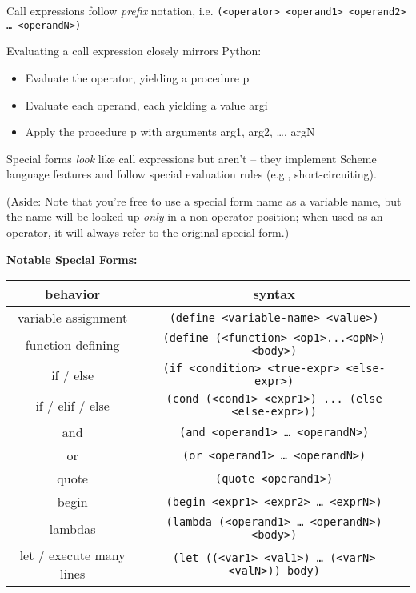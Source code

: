 Call expressions follow \textit{prefix} notation, i.e.
\texttt{(<operator> <operand1> <operand2> … <operandN>)}

Evaluating a call expression closely mirrors Python:
\begin{itemize}
\item Evaluate the operator, yielding a procedure p
\item Evaluate each operand, each yielding a value argi
\item Apply the procedure p with arguments arg1, arg2, …, argN
\end{itemize}

Special forms \textit{look} like call expressions but aren’t -- they implement Scheme language features and follow special evaluation rules (e.g., short-circuiting).

(Aside: Note that you’re free to use a special form name as a variable name, but the name will be looked up \textit{only} in a non-operator position; when used as an operator, it will always refer to the original special form.)

\textbf{Notable Special Forms:}
\begin{center}
\begin{tabular}{ |c|c| }
    \hline
    behavior & syntax \\
    \hline
    variable assignment   & \texttt{(define <variable-name> <value>)} \\
    \hline
    function defining & \texttt{(define (<function> <op1>...<opN>) <body>)} \\
    \hline
    if / else & \texttt{(if <condition> <true-expr> <else-expr>)} \\
    \hline
    if / elif / else & \texttt{(cond (<cond1> <expr1>) ... (else <else-expr>))} \\
    \hline
    and & \texttt{(and <operand1> … <operandN>)} \\
    \hline
    or & \texttt{(or <operand1> … <operandN>)} \\
    \hline
    quote & \texttt{(quote <operand1>)} \\
    \hline
    begin & \texttt{(begin <expr1> <expr2> … <exprN>)} \\
    \hline
    lambdas & \texttt{(lambda (<operand1> … <operandN>) <body>)} \\
    \hline
    let / execute many lines & \texttt{(let ((<var1> <val1>) … (<varN> <valN>)) body)} \\
    \hline
\end{tabular}
\end{center}
